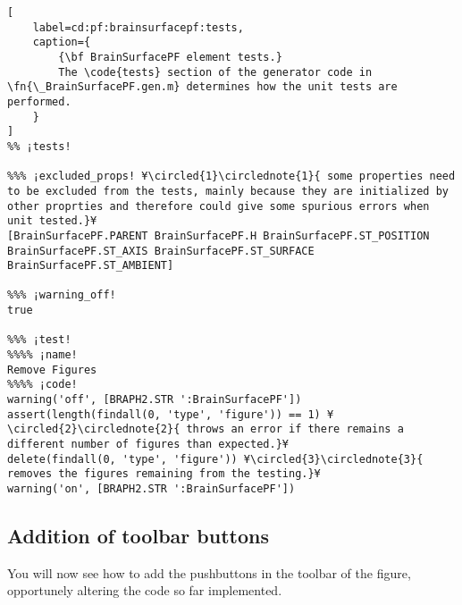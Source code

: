 \documentclass{tufte-handout}
\begin{document}
\begin{lstlisting}[
	label=cd:pf:brainsurfacepf:tests,
	caption={
		{\bf BrainSurfacePF element tests.}
		The \code{tests} section of the generator code in \fn{\_BrainSurfacePF.gen.m} determines how the unit tests are performed.
	}
]
%% ¡tests!

%%% ¡excluded_props! ¥\circled{1}\circlednote{1}{ some properties need to be excluded from the tests, mainly because they are initialized by other proprties and therefore could give some spurious errors when unit tested.}¥
[BrainSurfacePF.PARENT BrainSurfacePF.H BrainSurfacePF.ST_POSITION BrainSurfacePF.ST_AXIS BrainSurfacePF.ST_SURFACE BrainSurfacePF.ST_AMBIENT]

%%% ¡warning_off!
true

%%% ¡test!
%%%% ¡name!
Remove Figures
%%%% ¡code!
warning('off', [BRAPH2.STR ':BrainSurfacePF'])
assert(length(findall(0, 'type', 'figure')) == 1) ¥\circled{2}\circlednote{2}{ throws an error if there remains a different number of figures than expected.}¥
delete(findall(0, 'type', 'figure')) ¥\circled{3}\circlednote{3}{ removes the figures remaining from the testing.}¥
warning('on', [BRAPH2.STR ':BrainSurfacePF'])
\end{lstlisting}

\subsection{Addition of toolbar buttons}

You will now see how to add the pushbuttons in the toolbar of the figure, opportunely altering the code so far implemented.
\end{document}
